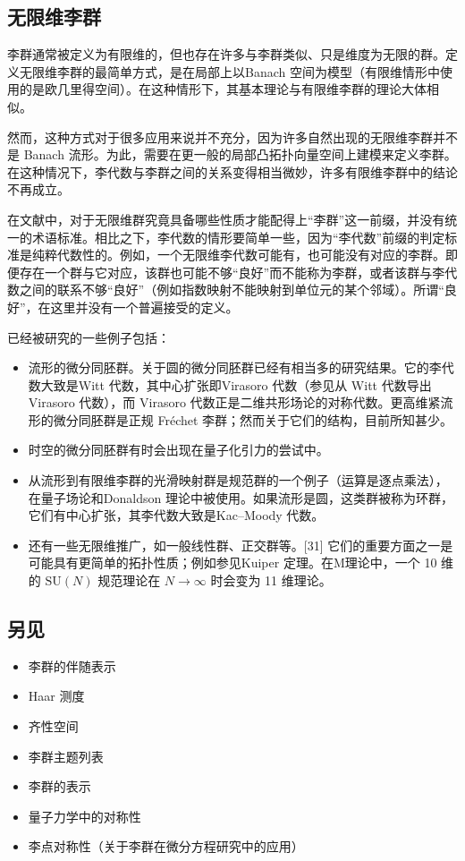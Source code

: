 \subsection{无限维李群}
李群通常被定义为有限维的，但也存在许多与李群类似、只是维度为无限的群。定义无限维李群的最简单方式，是在局部上以Banach 空间为模型（有限维情形中使用的是欧几里得空间）。在这种情形下，其基本理论与有限维李群的理论大体相似。

然而，这种方式对于很多应用来说并不充分，因为许多自然出现的无限维李群并不是 Banach 流形。为此，需要在更一般的局部凸拓扑向量空间上建模来定义李群。在这种情况下，李代数与李群之间的关系变得相当微妙，许多有限维李群中的结论不再成立。

在文献中，对于无限维群究竟具备哪些性质才能配得上“李群”这一前缀，并没有统一的术语标准。相比之下，李代数的情形要简单一些，因为“李代数”前缀的判定标准是纯粹代数性的。例如，一个无限维李代数可能有，也可能没有对应的李群。即便存在一个群与它对应，该群也可能不够“良好”而不能称为李群，或者该群与李代数之间的联系不够“良好”（例如指数映射不能映射到单位元的某个邻域）。所谓“良好”，在这里并没有一个普遍接受的定义。

已经被研究的一些例子包括：
\begin{itemize}
\item 流形的微分同胚群。关于圆的微分同胚群已经有相当多的研究结果。它的李代数大致是Witt 代数，其中心扩张即Virasoro 代数（参见从 Witt 代数导出 Virasoro 代数），而 Virasoro 代数正是二维共形场论的对称代数。更高维紧流形的微分同胚群是正规 Fréchet 李群；然而关于它们的结构，目前所知甚少。
\item 时空的微分同胚群有时会出现在量子化引力的尝试中。
\item 从流形到有限维李群的光滑映射群是规范群的一个例子（运算是逐点乘法），在量子场论和Donaldson 理论中被使用。如果流形是圆，这类群被称为环群，它们有中心扩张，其李代数大致是Kac–Moody 代数。
\item 还有一些无限维推广，如一般线性群、正交群等。[31] 它们的重要方面之一是可能具有更简单的拓扑性质；例如参见Kuiper 定理。在M理论中，一个 10 维的 $\mathrm{SU}(N)$ 规范理论在 $N \to \infty$ 时会变为 11 维理论。
\end{itemize}
\subsection{另见}
\begin{itemize}
\item 李群的伴随表示
\item Haar 测度
\item 齐性空间
\item 李群主题列表
\item 李群的表示
\item 量子力学中的对称性
\item 李点对称性（关于李群在微分方程研究中的应用）
\end{itemize}
